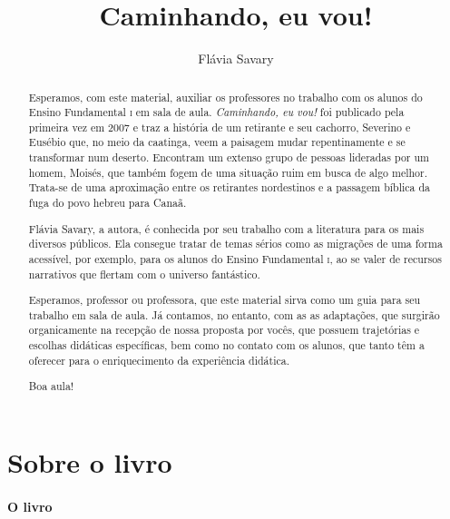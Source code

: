 \documentclass[11pt]{extarticle}
\newcommand{\AutorLivro}{Flávia Savary}
\newcommand{\TituloLivro}{Caminhando, eu vou!}
\newcommand{\colaborador}{Renier Silva}
\begin{document}
\title{\TituloLivro}
\author{\AutorLivro}
\def\authornotes{\colaborador}

\date{}
\maketitle


\tableofcontents


\begin{abstract}

Esperamos, com este material, auxiliar os professores no trabalho com os alunos 
do Ensino Fundamental \textsc{i} em sala de aula. \textit{Caminhando, eu vou!} foi publicado
pela primeira vez em 2007 e traz a história de um retirante e seu cachorro, Severino e Eusébio que,
no meio da caatinga, veem a paisagem mudar repentinamente e se transformar num deserto.
Encontram um extenso grupo de pessoas lideradas por um homem, Moisés, que também fogem de uma situação 
ruim em busca de algo melhor. Trata-se de uma aproximação entre os retirantes nordestinos
e a passagem bíblica da fuga do povo hebreu para Canaã. 

Flávia Savary, a autora, é conhecida por seu trabalho com a literatura para
os mais diversos públicos. Ela consegue tratar de temas sérios como as migrações
de uma forma acessível, por exemplo, para os alunos do Ensino Fundamental \textsc{i},
ao se valer de recursos narrativos que flertam com o universo fantástico. 

Esperamos, professor ou professora, que este material sirva como um guia 
para seu trabalho em sala de aula. Já contamos, no entanto, com as as adaptações,
que surgirão organicamente na recepção de nossa proposta por vocês, que possuem 
trajetórias e escolhas didáticas específicas, bem como no contato com os 
alunos, que tanto têm a oferecer para o enriquecimento da experiência didática.

Boa aula!

\end{abstract}

\section{Sobre o livro}

\paragraph{O livro} 
\end{document}
